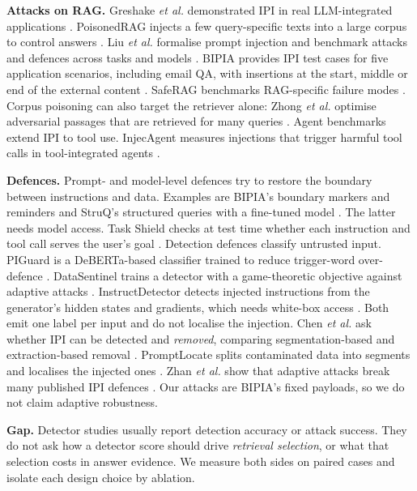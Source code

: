 \documentclass[conference]{IEEEtran}
\begin{document}
\textbf{Attacks on RAG.} Greshake \emph{et al.} demonstrated IPI in real
LLM-integrated applications \cite{greshake2023}. PoisonedRAG injects a few
query-specific texts into a large corpus to control answers
\cite{poisonedrag}. Liu \emph{et al.} formalise prompt injection and
benchmark attacks and defences across tasks and models \cite{liu2024}.
BIPIA provides IPI test cases for five application scenarios, including
email QA, with insertions at the start, middle or end of the external
content \cite{bipia2025}. SafeRAG benchmarks RAG-specific failure modes
\cite{saferag2025}. Corpus poisoning can also target the retriever alone:
Zhong \emph{et al.} optimise adversarial passages that are retrieved for
many queries \cite{zhong2023}. Agent benchmarks extend IPI to tool use.
InjecAgent measures injections that trigger harmful tool calls in
tool-integrated agents \cite{injecagent}.

\textbf{Defences.} Prompt- and model-level defences try to restore the
boundary between instructions and data. Examples are BIPIA's boundary
markers and reminders \cite{bipia2025} and StruQ's structured queries with
a fine-tuned model \cite{struq}. The latter needs model access. Task Shield checks at test time whether
each instruction and tool call serves the user's goal \cite{taskshield}.
Detection
defences classify untrusted input. PIGuard is a DeBERTa-based classifier
trained to reduce trigger-word over-defence \cite{piguard2025}.
DataSentinel trains a detector with a game-theoretic objective against
adaptive attacks \cite{datasentinel}. InstructDetector detects injected
instructions from the generator's hidden states and gradients, which needs
white-box access \cite{instructdetector}. Both emit one label per input and do
not localise the injection. Chen \emph{et al.} ask whether IPI can be
detected and \emph{removed}, comparing segmentation-based and
extraction-based removal \cite{chen2025detect}. PromptLocate splits
contaminated data into segments and localises the injected ones
\cite{promptlocate}. Zhan \emph{et al.} show that adaptive attacks break
many published IPI defences \cite{zhan2025}. Our attacks are BIPIA's fixed
payloads, so we do not claim adaptive robustness.

\textbf{Gap.} Detector studies usually report detection accuracy or attack
success. They do not ask how a detector score should drive \emph{retrieval
selection}, or what that selection costs in answer evidence. We measure
both sides on paired cases and isolate each design choice by ablation.
\end{document}
